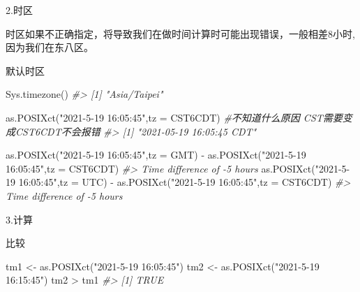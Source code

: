 \documentclass[
]{book}
\newenvironment{Shaded}{\begin{snugshade}}{\end{snugshade}}
\newcommand{\AttributeTok}[1]{\textcolor[rgb]{0.77,0.63,0.00}{#1}}
\newcommand{\CommentTok}[1]{\textcolor[rgb]{0.56,0.35,0.01}{\textit{#1}}}
\newcommand{\FunctionTok}[1]{\textcolor[rgb]{0.00,0.00,0.00}{#1}}
\newcommand{\NormalTok}[1]{#1}
\newcommand{\OtherTok}[1]{\textcolor[rgb]{0.56,0.35,0.01}{#1}}
\newcommand{\SpecialCharTok}[1]{\textcolor[rgb]{0.00,0.00,0.00}{#1}}
\newcommand{\StringTok}[1]{\textcolor[rgb]{0.31,0.60,0.02}{#1}}
\begin{document}
2.时区

时区如果不正确指定，将导致我们在做时间计算时可能出现错误，一般相差8小时,因为我们在东八区。

默认时区

\begin{Shaded}
\begin{Highlighting}[]
\FunctionTok{Sys.timezone}\NormalTok{()}
\CommentTok{\#\textgreater{} [1] "Asia/Taipei"}
\end{Highlighting}
\end{Shaded}

\begin{Shaded}
\begin{Highlighting}[]
\FunctionTok{as.POSIXct}\NormalTok{(}\StringTok{"2021{-}5{-}19 16:05:45"}\NormalTok{,}\AttributeTok{tz =} \StringTok{\textquotesingle{}CST6CDT\textquotesingle{}}\NormalTok{) }\CommentTok{\#不知道什么原因 CST需要变成CST6CDT不会报错}
\CommentTok{\#\textgreater{} [1] "2021{-}05{-}19 16:05:45 CDT"}
\end{Highlighting}
\end{Shaded}

\begin{Shaded}
\begin{Highlighting}[]
\FunctionTok{as.POSIXct}\NormalTok{(}\StringTok{"2021{-}5{-}19 16:05:45"}\NormalTok{,}\AttributeTok{tz =} \StringTok{\textquotesingle{}GMT\textquotesingle{}}\NormalTok{) }\SpecialCharTok{{-}} \FunctionTok{as.POSIXct}\NormalTok{(}\StringTok{"2021{-}5{-}19 16:05:45"}\NormalTok{,}\AttributeTok{tz =} \StringTok{\textquotesingle{}CST6CDT\textquotesingle{}}\NormalTok{)}
\CommentTok{\#\textgreater{} Time difference of {-}5 hours}
\FunctionTok{as.POSIXct}\NormalTok{(}\StringTok{"2021{-}5{-}19 16:05:45"}\NormalTok{,}\AttributeTok{tz =} \StringTok{\textquotesingle{}UTC\textquotesingle{}}\NormalTok{) }\SpecialCharTok{{-}} \FunctionTok{as.POSIXct}\NormalTok{(}\StringTok{"2021{-}5{-}19 16:05:45"}\NormalTok{,}\AttributeTok{tz =} \StringTok{\textquotesingle{}CST6CDT\textquotesingle{}}\NormalTok{)}
\CommentTok{\#\textgreater{} Time difference of {-}5 hours}
\end{Highlighting}
\end{Shaded}

3.计算

比较

\begin{Shaded}
\begin{Highlighting}[]
\NormalTok{tm1 }\OtherTok{\textless{}{-}} \FunctionTok{as.POSIXct}\NormalTok{(}\StringTok{"2021{-}5{-}19 16:05:45"}\NormalTok{) }
\NormalTok{tm2 }\OtherTok{\textless{}{-}} \FunctionTok{as.POSIXct}\NormalTok{(}\StringTok{"2021{-}5{-}19 16:15:45"}\NormalTok{) }
\NormalTok{tm2 }\SpecialCharTok{\textgreater{}}\NormalTok{ tm1}
\CommentTok{\#\textgreater{} [1] TRUE}
\end{Highlighting}
\end{Shaded}
\end{document}
